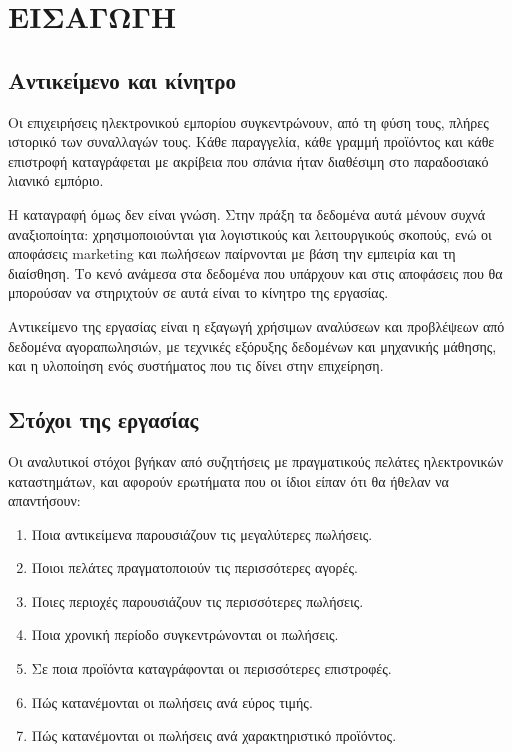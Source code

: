 \chapter{ΕΙΣΑΓΩΓΗ}
\label{chap:introduction}

\section{Αντικείμενο και κίνητρο}

Οι επιχειρήσεις ηλεκτρονικού εμπορίου συγκεντρώνουν, από τη φύση τους, πλήρες
ιστορικό των συναλλαγών τους. Κάθε παραγγελία, κάθε γραμμή προϊόντος και κάθε
επιστροφή καταγράφεται με ακρίβεια που σπάνια ήταν διαθέσιμη στο παραδοσιακό
λιανικό εμπόριο.

Η καταγραφή όμως δεν είναι γνώση. Στην πράξη τα δεδομένα αυτά μένουν συχνά
αναξιοποίητα: χρησιμοποιούνται για λογιστικούς και λειτουργικούς σκοπούς, ενώ
οι αποφάσεις marketing και πωλήσεων παίρνονται με βάση την εμπειρία και τη
διαίσθηση. Το κενό ανάμεσα στα δεδομένα που υπάρχουν και στις αποφάσεις που θα
μπορούσαν να στηριχτούν σε αυτά είναι το κίνητρο της εργασίας.

Αντικείμενο της εργασίας είναι η εξαγωγή χρήσιμων αναλύσεων και προβλέψεων από
δεδομένα αγοραπωλησιών, με τεχνικές εξόρυξης δεδομένων και μηχανικής μάθησης,
και η υλοποίηση ενός συστήματος που τις δίνει στην επιχείρηση.

\section{Στόχοι της εργασίας}

Οι αναλυτικοί στόχοι βγήκαν από συζητήσεις με πραγματικούς πελάτες ηλεκτρονικών
καταστημάτων, και αφορούν ερωτήματα που οι ίδιοι είπαν ότι θα ήθελαν να
απαντήσουν:

\begin{enumerate}
  \item Ποια αντικείμενα παρουσιάζουν τις μεγαλύτερες πωλήσεις.
  \item Ποιοι πελάτες πραγματοποιούν τις περισσότερες αγορές.
  \item Ποιες περιοχές παρουσιάζουν τις περισσότερες πωλήσεις.
  \item Ποια χρονική περίοδο συγκεντρώνονται οι πωλήσεις.
  \item Σε ποια προϊόντα καταγράφονται οι περισσότερες επιστροφές.
  \item Πώς κατανέμονται οι πωλήσεις ανά εύρος τιμής.
  \item Πώς κατανέμονται οι πωλήσεις ανά χαρακτηριστικό προϊόντος.
\end{enumerate}

